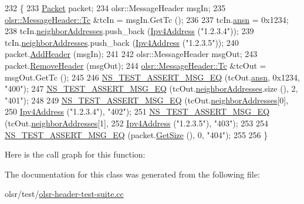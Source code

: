 \begin{DoxyCode}
232 \{
233   \hyperlink{classns3_1_1Packet}{Packet} packet;
234   olsr::MessageHeader msgIn;
235   \hyperlink{structns3_1_1olsr_1_1MessageHeader_1_1Tc}{olsr::MessageHeader::Tc} &tcIn = msgIn.GetTc ();
236 
237   tcIn.\hyperlink{structns3_1_1olsr_1_1MessageHeader_1_1Tc_a0f74e45f855b1b500fb950336ef4aa63}{ansn} = 0x1234;
238   tcIn.\hyperlink{structns3_1_1olsr_1_1MessageHeader_1_1Tc_a236424f611929db7d7f154f8c31c970e}{neighborAddresses}.push\_back (\hyperlink{classns3_1_1Ipv4Address}{Ipv4Address} (\textcolor{stringliteral}{"1.2.3.4"}));
239   tcIn.\hyperlink{structns3_1_1olsr_1_1MessageHeader_1_1Tc_a236424f611929db7d7f154f8c31c970e}{neighborAddresses}.push\_back (\hyperlink{classns3_1_1Ipv4Address}{Ipv4Address} (\textcolor{stringliteral}{"1.2.3.5"}));
240   packet.\hyperlink{classns3_1_1Packet_a465108c595a0bc592095cbcab1832ed8}{AddHeader} (msgIn);
241 
242   olsr::MessageHeader msgOut;
243   packet.\hyperlink{classns3_1_1Packet_a0961eccf975d75f902d40956c93ba63e}{RemoveHeader} (msgOut);
244   \hyperlink{structns3_1_1olsr_1_1MessageHeader_1_1Tc}{olsr::MessageHeader::Tc} &tcOut = msgOut.GetTc ();
245 
246   \hyperlink{group__testing_ga2a9d78cffb3db8e867c35fff0b698cf5}{NS\_TEST\_ASSERT\_MSG\_EQ} (tcOut.\hyperlink{structns3_1_1olsr_1_1MessageHeader_1_1Tc_a0f74e45f855b1b500fb950336ef4aa63}{ansn}, 0x1234, \textcolor{stringliteral}{"400"});
247   \hyperlink{group__testing_ga2a9d78cffb3db8e867c35fff0b698cf5}{NS\_TEST\_ASSERT\_MSG\_EQ} (tcOut.\hyperlink{structns3_1_1olsr_1_1MessageHeader_1_1Tc_a236424f611929db7d7f154f8c31c970e}{neighborAddresses}.size (), 2, \textcolor{stringliteral}{"401"});
248 
249   \hyperlink{group__testing_ga2a9d78cffb3db8e867c35fff0b698cf5}{NS\_TEST\_ASSERT\_MSG\_EQ} (tcOut.\hyperlink{structns3_1_1olsr_1_1MessageHeader_1_1Tc_a236424f611929db7d7f154f8c31c970e}{neighborAddresses}[0],
250                          \hyperlink{classns3_1_1Ipv4Address}{Ipv4Address} (\textcolor{stringliteral}{"1.2.3.4"}), \textcolor{stringliteral}{"402"});
251   \hyperlink{group__testing_ga2a9d78cffb3db8e867c35fff0b698cf5}{NS\_TEST\_ASSERT\_MSG\_EQ} (tcOut.\hyperlink{structns3_1_1olsr_1_1MessageHeader_1_1Tc_a236424f611929db7d7f154f8c31c970e}{neighborAddresses}[1],
252                          \hyperlink{classns3_1_1Ipv4Address}{Ipv4Address} (\textcolor{stringliteral}{"1.2.3.5"}), \textcolor{stringliteral}{"403"});
253 
254   \hyperlink{group__testing_ga2a9d78cffb3db8e867c35fff0b698cf5}{NS\_TEST\_ASSERT\_MSG\_EQ} (packet.\hyperlink{classns3_1_1Packet_a462855c9929954d4301a4edfe55f4f1c}{GetSize} (), 0, \textcolor{stringliteral}{"404"});
255 
256 \}
\end{DoxyCode}


Here is the call graph for this function\+:




The documentation for this class was generated from the following file\+:\begin{DoxyCompactItemize}
\item 
olsr/test/\hyperlink{olsr-header-test-suite_8cc}{olsr-\/header-\/test-\/suite.\+cc}\end{DoxyCompactItemize}
